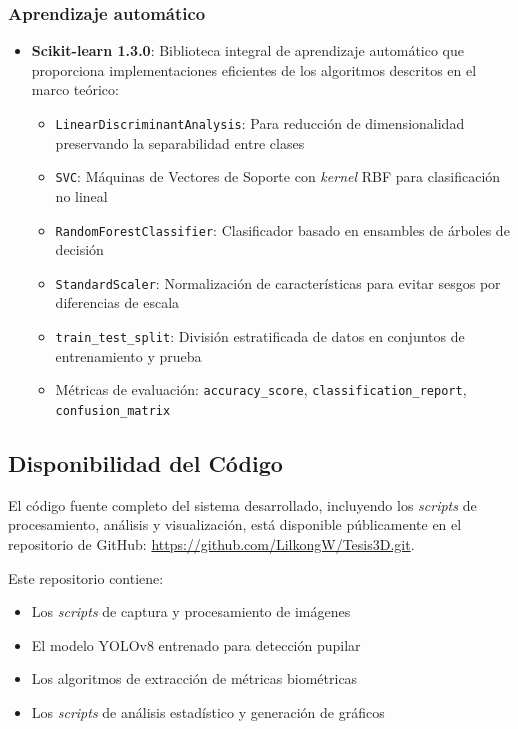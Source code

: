 \subsubsection{Aprendizaje automático}

\begin{itemize}
	\item \textbf{Scikit-learn 1.3.0}: Biblioteca integral de aprendizaje automático que proporciona implementaciones eficientes de los algoritmos descritos en el marco teórico:
	\begin{itemize}
		\item \texttt{LinearDiscriminantAnalysis}: Para reducción de dimensionalidad preservando la separabilidad entre clases
		\item \texttt{SVC}: Máquinas de Vectores de Soporte con \textit{kernel} RBF para clasificación no lineal
		\item \texttt{RandomForestClassifier}: Clasificador basado en ensambles de árboles de decisión
		\item \texttt{StandardScaler}: Normalización de características para evitar sesgos por diferencias de escala
		\item \texttt{train\_test\_split}: División estratificada de datos en conjuntos de entrenamiento y prueba
		\item Métricas de evaluación: \texttt{accuracy\_score}, \texttt{classification\_report}, \newline \texttt{confusion\_matrix}
	\end{itemize}
\end{itemize}


\subsection{Disponibilidad del Código}
El código fuente completo del sistema desarrollado, incluyendo los \textit{scripts} de procesamiento, análisis y visualización, está disponible públicamente en el repositorio de GitHub: \url{https://github.com/LilkongW/Tesis3D.git}. 

Este repositorio contiene:
\begin{itemize}
	\item Los \textit{scripts} de captura y procesamiento de imágenes
	\item El modelo YOLOv8 entrenado para detección pupilar
	\item Los algoritmos de extracción de métricas biométricas
	\item Los \textit{scripts} de análisis estadístico y generación de gráficos
\end{itemize}


